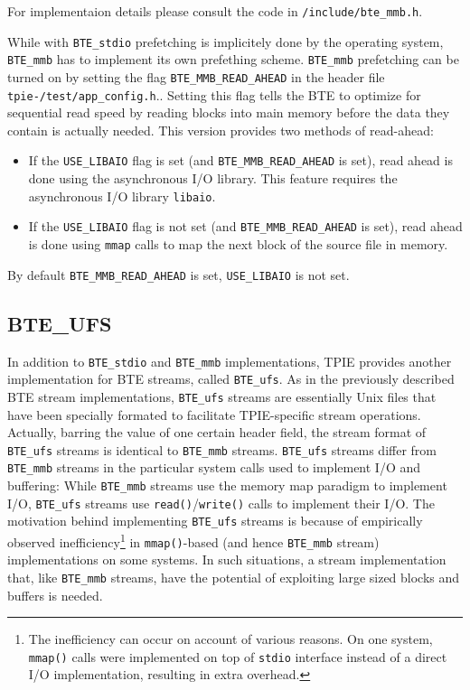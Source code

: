 For implementaion details please consult the code in
\verb|/include/bte_mmb.h|.

While with \verb|BTE_stdio| prefetching is implicitely done by the
operating system, \verb|BTE_mmb| has to implement its own prefething
scheme. \verb|BTE_mmb| prefetching can be turned on by setting the flag
\verb|BTE_MMB_READ_AHEAD| in the header file {\tt
  tpie-\version/test/app\_config.h}..
Setting this flag tells the BTE to optimize for sequential read speed by
reading blocks into main memory before the data they contain is actually
needed. This version provides two methods of read-ahead:
\begin{itemize}
\item If the \verb|USE_LIBAIO| flag is set (and \verb|BTE_MMB_READ_AHEAD|
  is set), read ahead is done using the asynchronous I/O library.  This
  feature requires the asynchronous I/O library {\tt libaio}.
\item If the \verb|USE_LIBAIO| flag is not set (and
  \verb|BTE_MMB_READ_AHEAD| is set), read ahead is done using \verb|mmap|
  calls to map the next block of the source file in memory.
\end{itemize}

By default \verb|BTE_MMB_READ_AHEAD| is set, \verb|USE_LIBAIO| is not set.


\subsection{BTE\_UFS}

In addition to \verb|BTE_stdio| and  \verb|BTE_mmb| implementations,
TPIE provides another implementation for BTE streams, called
\verb|BTE_ufs|. As in the previously described BTE stream
implementations, \verb|BTE_ufs| streams are essentially Unix files
that have been specially formated to facilitate TPIE-specific stream
operations. Actually, barring the value of one certain header field, the 
stream format of \verb|BTE_ufs| streams is identical to
\verb|BTE_mmb| streams. \verb|BTE_ufs| streams differ from 
\verb|BTE_mmb| streams in the particular system calls used to
implement I/O and buffering: While \verb|BTE_mmb| streams use the memory
map paradigm to implement I/O,  \verb|BTE_ufs| streams use 
\verb|read()|/\verb|write()| calls to implement their I/O. The
motivation behind implementing  \verb|BTE_ufs| streams is because of
empirically observed inefficiency\footnote{The inefficiency can occur
on account of various reasons. On one system,  \verb|mmap()| calls
were implemented on top of  \verb|stdio| interface instead of a direct
I/O implementation, resulting in extra overhead.} 
in \verb|mmap()|-based (and hence
\verb|BTE_mmb| stream) implementations on some systems. 
In such situations, a stream implementation that,
like  \verb|BTE_mmb| streams, have the potential of  
exploiting large sized blocks and buffers is needed.



